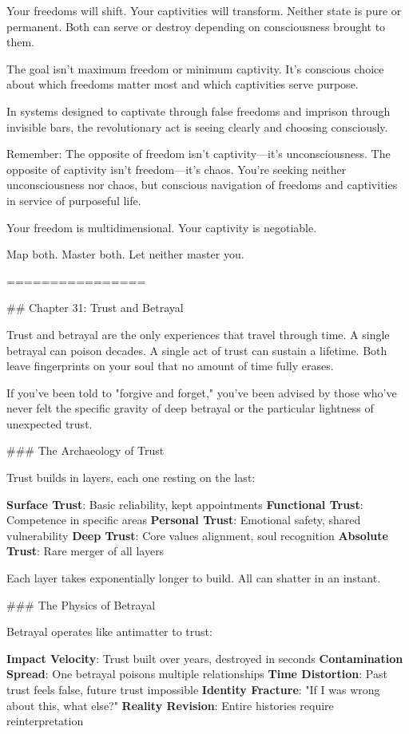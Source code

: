 \documentclass[12pt]{book}
\begin{document}
Your freedoms will shift. Your captivities will transform. Neither state is pure or permanent. Both can serve or destroy depending on consciousness brought to them.

The goal isn't maximum freedom or minimum captivity. It's conscious choice about which freedoms matter most and which captivities serve purpose.

In systems designed to captivate through false freedoms and imprison through invisible bars, the revolutionary act is seeing clearly and choosing consciously.

Remember: The opposite of freedom isn't captivity—it's unconsciousness. The opposite of captivity isn't freedom—it's chaos. You're seeking neither unconsciousness nor chaos, but conscious navigation of freedoms and captivities in service of purposeful life.

Your freedom is multidimensional. Your captivity is negotiable.

Map both. Master both. Let neither master you.

================

\#\# Chapter 31: Trust and Betrayal

Trust and betrayal are the only experiences that travel through time. A single betrayal can poison decades. A single act of trust can sustain a lifetime. Both leave fingerprints on your soul that no amount of time fully erases.

If you've been told to "forgive and forget," you've been advised by those who've never felt the specific gravity of deep betrayal or the particular lightness of unexpected trust.

\#\#\# The Archaeology of Trust

Trust builds in layers, each one resting on the last:

\textbf{Surface Trust}: Basic reliability, kept appointments
\textbf{Functional Trust}: Competence in specific areas
\textbf{Personal Trust}: Emotional safety, shared vulnerability
\textbf{Deep Trust}: Core values alignment, soul recognition
\textbf{Absolute Trust}: Rare merger of all layers

Each layer takes exponentially longer to build. All can shatter in an instant.

\#\#\# The Physics of Betrayal

Betrayal operates like antimatter to trust:

\textbf{Impact Velocity}: Trust built over years, destroyed in seconds
\textbf{Contamination Spread}: One betrayal poisons multiple relationships
\textbf{Time Distortion}: Past trust feels false, future trust impossible
\textbf{Identity Fracture}: "If I was wrong about this, what else?"
\textbf{Reality Revision}: Entire histories require reinterpretation
\end{document}
